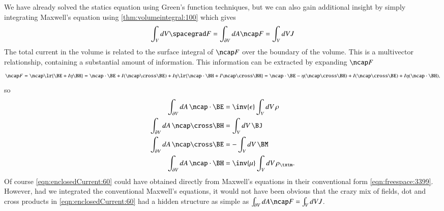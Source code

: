 %
%
We have already solved the statics equation using Green's function techniques, but we can also gain additional insight by simply integrating Maxwell's equation using \cref{thm:volumeintegral:100} which gives
\begin{equation}\label{eqn:enclosedCurrent:20}
\int_V dV \spacegrad F = \int_{\partial V} dA \ncap F = \int_V dV J
\end{equation}
The total current in the volume is related to the surface integral of \( \ncap F \) over the boundary of the volume.
This is a multivector relationship, containing a substantial amount of information.
This information can be extracted by
expanding \( \ncap F \)
\begin{dmath}\label{eqn:enclosedCurrent:40}
\ncap F
=
\ncap \lr{ \BE + I \eta \BH }
=
\ncap \cdot \BE + I (\ncap \cross \BE) + I \eta \lr{ \ncap \cdot \BH + I \ncap \cross \BH }
=
\ncap \cdot \BE - \eta ( \ncap \cross \BH ) + I (\ncap \cross \BE) + I \eta (\ncap \cdot \BH),
\end{dmath}
so
\begin{dmath}\label{eqn:enclosedCurrent:60}
\begin{aligned}
\int_{\partial V} dA\, \ncap \cdot \BE        &=  \inv{\epsilon} \int_V dV\, \rho \\
\int_{\partial V} dA\, \ncap \cross \BH       &=                 \int_V dV\, \BJ \\
\int_{\partial V} dA\, \ncap \cross \BE       &=               - \int_V dV\, \BM \\
\int_{\partial V} dA\, \ncap \cdot \BH        &=  \inv{\mu} \int_V dV\, \rho_\txtm.
\end{aligned}
\end{dmath}
Of course \cref{eqn:enclosedCurrent:60}
could have obtained directly from Maxwell's equations in their conventional form \cref{eqn:freespace:3399}.
However, had we integrated the conventional Maxwell's equations, it would not have been obvious that the crazy mix of
fields, dot and cross products in \cref{eqn:enclosedCurrent:60} had a hidden structure as simple as
\( \int_{\partial V} dA \ncap F = \int_V dV J \).
